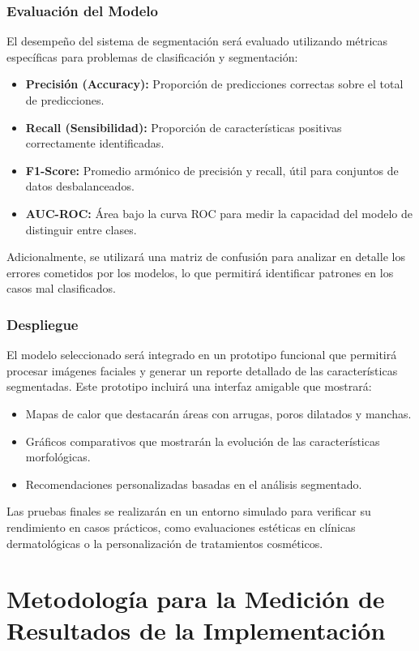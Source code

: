 \subsubsection{Evaluación del Modelo}
El desempeño del sistema de segmentación será evaluado utilizando métricas específicas para problemas de clasificación y segmentación:
\begin{itemize}
    \item \textbf{Precisión (Accuracy):} Proporción de predicciones correctas sobre el total de predicciones.
    \item \textbf{Recall (Sensibilidad):} Proporción de características positivas correctamente identificadas.
    \item \textbf{F1-Score:} Promedio armónico de precisión y recall, útil para conjuntos de datos desbalanceados.
    \item \textbf{AUC-ROC:} Área bajo la curva ROC para medir la capacidad del modelo de distinguir entre clases.
\end{itemize}

Adicionalmente, se utilizará una matriz de confusión para analizar en detalle los errores cometidos por los modelos, lo que permitirá identificar patrones en los casos mal clasificados.

\subsubsection{Despliegue}
El modelo seleccionado será integrado en un prototipo funcional que permitirá procesar imágenes faciales y generar un reporte detallado de las características segmentadas. Este prototipo incluirá una interfaz amigable que mostrará:
\begin{itemize}
    \item Mapas de calor que destacarán áreas con arrugas, poros dilatados y manchas.
    \item Gráficos comparativos que mostrarán la evolución de las características morfológicas.
    \item Recomendaciones personalizadas basadas en el análisis segmentado.
\end{itemize}

Las pruebas finales se realizarán en un entorno simulado para verificar su rendimiento en casos prácticos, como evaluaciones estéticas en clínicas dermatológicas o la personalización de tratamientos cosméticos.

\section{Metodología para la Medición de Resultados de la Implementación}

